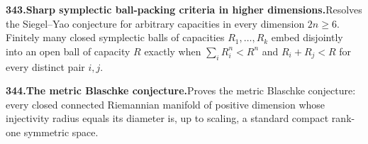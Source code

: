 \documentclass[11pt,a4paper]{article}
\begin{document}
  \par \begin{minipage}{\linewidth}
  \fontsize{10.5}{12.6}\selectfont\RaggedRight
  \hypertarget{result 343}{}
  {\bfseries\textcolor{muted}{343.}\enspace Sharp symplectic ball-packing criteria in higher dimensions.}\enspace Resolves the Siegel--Yao conjecture for arbitrary capacities in every dimension $2n\ge6$. Finitely many closed symplectic balls of capacities $R_1,\ldots,R_k$ embed disjointly into an open ball of capacity $R$ exactly when $\sum_iR_i^n<R^n$ and $R_i+R_j<R$ for every distinct pair $i,j$.\par
  \end{minipage}\par\vspace{5pt}



  \par \begin{minipage}{\linewidth}
  \fontsize{10.5}{12.6}\selectfont\RaggedRight
  \hypertarget{result 344}{}
  {\bfseries\textcolor{muted}{344.}\enspace The metric Blaschke conjecture.}\enspace Proves the metric Blaschke conjecture: every closed connected Riemannian manifold of positive dimension whose injectivity radius equals its diameter is, up to scaling, a standard compact rank-one symmetric space.\par
  \end{minipage}\par\vspace{5pt}
\end{document}
